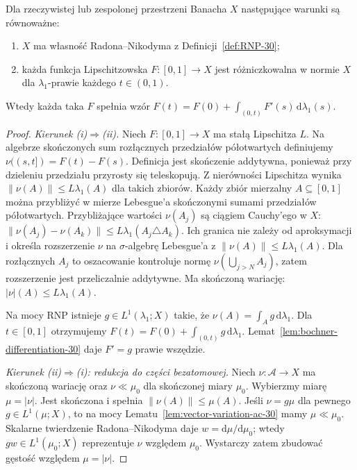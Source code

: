 \begin{twierdzenie}
\label{thm:rnp-lipschitz-equiv-30}
Dla rzeczywistej lub zespolonej przestrzeni Banacha $X$
następujące warunki są równoważne:
\begin{enumerate}[label=(\roman*)]
 \item $X$ ma własność Radona--Nikodyma z
       Definicji~\ref{def:RNP-30};
 \item każda funkcja Lipschitzowska
       $F:[0,1]\to X$ jest różniczkowalna w normie $X$
       dla $\lambda_1$-prawie każdego $t\in(0,1)$.
\end{enumerate}
Wtedy każda taka $F$ spełnia wzór
$F(t)=F(0)+\int_{(0,t)}F'(s)\,\mathrm d\lambda_1(s)$.
\end{twierdzenie}
\begin{proof}
\emph{Kierunek (i)$\Rightarrow$(ii).}
Niech $F:[0,1]\to X$ ma stałą Lipschitza $L$.
Na algebrze skończonych sum rozłącznych przedziałów
półotwartych definiujemy
$\nu((s,t])=F(t)-F(s)$. Definicja jest skończenie
addytywna, ponieważ przy dzieleniu przedziału przyrosty
się teleskopują. Z nierówności Lipschitza wynika
$\|\nu(A)\|\le L\lambda_1(A)$ dla takich zbiorów.
Każdy zbiór mierzalny $A\subseteq[0,1]$ można
przybliżyć w mierze Lebesgue'a skończonymi sumami
przedziałów półotwartych. Przybliżające wartości
$\nu(A_j)$ są ciągiem Cauchy'ego w $X$:
$\|\nu(A_j)-\nu(A_k)\|\le L\lambda_1(A_j\triangle A_k)$.
Ich granica nie zależy od aproksymacji i określa
rozszerzenie $\nu$ na $\sigma$-algebrę Lebesgue'a z
$\|\nu(A)\|\le L\lambda_1(A)$. Dla rozłącznych
$A_j$ to oszacowanie kontroluje normę
$\nu(\bigcup_{j>N}A_j)$, zatem rozszerzenie jest
przeliczalnie addytywne. Ma skończoną wariację:
$|\nu|(A)\le L\lambda_1(A)$.

Na mocy RNP istnieje $g\in L^1(\lambda_1;X)$ takie,
że $\nu(A)=\int_Ag\,\mathrm d\lambda_1$.
Dla $t\in[0,1]$ otrzymujemy
$F(t)=F(0)+\int_{(0,t)}g\,\mathrm d\lambda_1$.
Lemat~\ref{lem:bochner-differentiation-30} daje
$F'=g$ prawie wszędzie.

\emph{Kierunek (ii)$\Rightarrow$(i): redukcja do części bezatomowej.}
Niech $\nu:\mathcal A\to X$ ma skończoną wariację
oraz $\nu\ll\mu_0$ dla skończonej miary $\mu_0$.
Wybierzmy miarę $\mu=|\nu|$. Jest skończona i
spełnia $\|\nu(A)\|\le\mu(A)$.
Jeśli $\nu=g\mu$ dla pewnego $g\in L^1(\mu;X)$,
to na mocy Lematu~\ref{lem:vector-variation-ac-30}
mamy $\mu\ll\mu_0$. Skalarne twierdzenie
Radona--Nikodyma daje $w=\mathrm d\mu/\mathrm d\mu_0$;
wtedy $gw\in L^1(\mu_0;X)$ reprezentuje $\nu$
względem $\mu_0$. Wystarczy zatem zbudować
gęstość względem $\mu=|\nu|$.


\end{proof}
